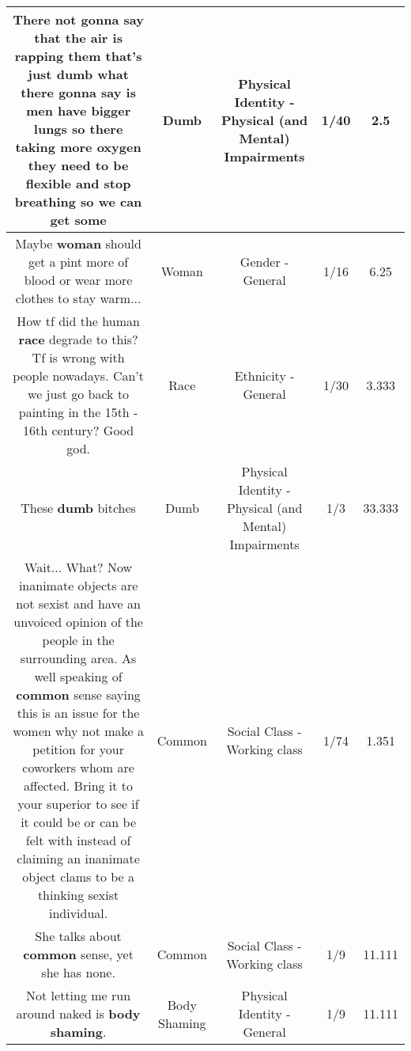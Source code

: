 \documentclass[11pt]{article}
\newlength\mylength
\begin{document}
\begin{center}
\begin{longtable}{|C{.65\mylength}|C{.30\mylength}|C{.12\mylength}|C{.12\mylength}|C{.12\mylength}|}
  \small There not gonna say that the air is rapping them that's just \textbf{dumb} what there gonna say is men have bigger lungs so there taking more oxygen they need to be flexible and stop breathing so we can get some\normalsize   & Dumb & Physical Identity - Physical (and Mental) Impairments & 1/40 & 2.5 \\  \hline
  \small Maybe \textbf{woman} should get a pint more of blood or wear more clothes to stay warm...\normalsize   & Woman & Gender - General & 1/16 & 6.25 \\  \hline
  \small How tf did the human \textbf{race} degrade to this? Tf is wrong with people nowadays. Can't we just go back to painting in the 15th - 16th century? Good god.\normalsize   & Race & Ethnicity - General & 1/30 & 3.333 \\  \hline
  \small These \textbf{dumb} bitches\normalsize   & Dumb & Physical Identity - Physical (and Mental) Impairments & 1/3 & 33.333 \\  \hline
  \small Wait... What? Now inanimate objects are not sexist and have an unvoiced opinion of the people in the surrounding area. As well speaking of \textbf{common} sense saying this is an issue for the women why not make a petition for your coworkers whom are affected. Bring it to your superior to see if it could be or can be felt with instead of claiming an inanimate object clams to be a thinking sexist individual.\normalsize   & Common & Social Class - Working class & 1/74 & 1.351 \\  \hline
  \small She talks about \textbf{common} sense, yet she has none.\normalsize   & Common & Social Class - Working class & 1/9 & 11.111 \\  \hline
  \small Not letting me run around naked is \textbf{body shaming}.\normalsize   & Body Shaming & Physical Identity - General & 1/9 & 11.111 \\  \hline

\end{longtable}
\end{center}
\end{document}
